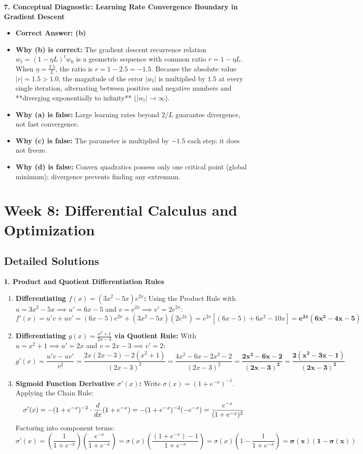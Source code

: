 \textbf{7. Conceptual Diagnostic: Learning Rate Convergence Boundary in Gradient Descent}
\begin{itemize}
    \item \textbf{Correct Answer: (b)}
    \item \textbf{Why (b) is correct:} The gradient descent recurrence relation $w_t = (1 - \eta L)^t w_0$ is a geometric sequence with common ratio $r = 1 - \eta L$. When $\eta = \frac{2.5}{L}$, the ratio is $r = 1 - 2.5 = -1.5$. Because the absolute value $|r| = 1.5 > 1.0$, the magnitude of the error $|w_t|$ is multiplied by $1.5$ at every single iteration, alternating between positive and negative numbers and **diverging exponentially to infinity** ($|w_t| \to \infty$).
    \item \textbf{Why (a) is false:} Large learning rates beyond $2/L$ guarantee divergence, not fast convergence.
    \item \textbf{Why (c) is false:} The parameter is multiplied by $-1.5$ each step; it does not freeze.
    \item \textbf{Why (d) is false:} Convex quadratics possess only one critical point (global minimum); divergence prevents finding any extremum.
\end{itemize}

\section*{Week 8: Differential Calculus and Optimization}

\subsection*{Detailed Solutions}

\textbf{1. Product and Quotient Differentiation Rules}
\begin{enumerate}
    \item \textbf{Differentiating $f(x) = (3x^2 - 5x)e^{2x}$:}
    Using the Product Rule with $u = 3x^2 - 5x \implies u' = 6x - 5$ and $v = e^{2x} \implies v' = 2e^{2x}$:
    $$f'(x) = u'v + uv' = (6x - 5)e^{2x} + (3x^2 - 5x)(2e^{2x}) = e^{2x}\left[(6x - 5) + 6x^2 - 10x\right] = \mathbf{e^{2x}(6x^2 - 4x - 5)}$$
    \item \textbf{Differentiating $g(x) = \frac{x^2 + 1}{2x - 3}$ via Quotient Rule:}
    With $u = x^2 + 1 \implies u' = 2x$ and $v = 2x - 3 \implies v' = 2$:
    $$g'(x) = \frac{u'v - uv'}{v^2} = \frac{2x(2x - 3) - 2(x^2 + 1)}{(2x - 3)^2} = \frac{4x^2 - 6x - 2x^2 - 2}{(2x - 3)^2} = \mathbf{\frac{2x^2 - 6x - 2}{(2x - 3)^2} = \frac{2(x^2 - 3x - 1)}{(2x - 3)^2}}$$
    \item \textbf{Sigmoid Function Derivative $\sigma'(x)$:}
    Write $\sigma(x) = (1 + e^{-x})^{-1}$. Applying the Chain Rule:
    $$\sigma'(x) = -(1 + e^{-x})^{-2} \cdot \frac{d}{dx}(1 + e^{-x}) = -(1 + e^{-x})^{-2}(-e^{-x}) = \frac{e^{-x}}{(1 + e^{-x})^2}$$
    Factoring into component terms:
    $$\sigma'(x) = \left(\frac{1}{1 + e^{-x}}\right) \left(\frac{e^{-x}}{1 + e^{-x}}\right) = \sigma(x) \left(\frac{(1 + e^{-x}) - 1}{1 + e^{-x}}\right) = \sigma(x)\left(1 - \frac{1}{1 + e^{-x}}\right) = \mathbf{\sigma(x)(1 - \sigma(x))}$$
\end{enumerate}

